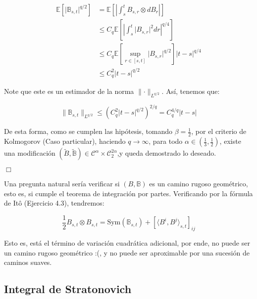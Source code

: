 \begin{itemize}
	\begin{align*}
		\mathbb{E}[ \lvert \mathbb{B}_{s,t} \rvert^{q/2} ] &= \mathbb{E} \left[ \left\lvert \int_s^t B_{s,r} \otimes dB_r \right\rvert \right] \\
		&\leq C_q \mathbb{E} \left[ \left\lvert \int_s^t \lvert B_{s,r} \rvert^2 dr \right\rvert^{q/4} \right] \\
		&\leq C_q \mathbb{E}\left[  \sup_{r \in [s,t]} \lvert B_{s,r} \rvert^{q/2} \right] \lvert t- s \rvert^{q/4} \\
		&\leq C_q^2 \lvert t - s \rvert^{q/2}
	\end{align*}

	Note que este es un estimador de la norma $\lVert \cdot \rVert_{L^{q/2}}$. Así, tenemos que:

	\[
		\lVert \mathbb{B}_{s,t} \rVert_{L^{q/2}} \leq \left( C_q^2 \lvert t- s \rvert^{q/2} \right)^{2/q} = C_q^{4/q} \lvert t- s\rvert
	\]
 

\end{itemize}

De esta forma, como se cumplen las hipótesis, tomando $\beta = \frac{1}{2}$, por el criterio de Kolmogorov (Caso particular), haciendo $q \rightarrow \infty$, para todo $\alpha \in \left( \frac{1}{3}, \frac{1}{2} \right)$, existe una modificación $(\tilde{B}, \tilde{\mathbb{B}}) \in \mathcal{C}^{\alpha} \times \mathcal{C}^{2\alpha}_2$,y queda  demostrado lo deseado.

\begin{flushright}
	$\Box$
\end{flushright}

Una pregunta natural sería verificar si $(B, \mathbb{B})$ es un camino rugoso geométrico, esto es, si cumple el teorema de integración por partes. Verificando por la fórmula de Itô (Ejercicio 4.3), tendremos:

\[
	\frac{1}{2} B_{s,t} \otimes B_{s,t} = \text{Sym}(\mathbb{B}_{s,t}) + \left[\langle B^i, B^j \rangle_{s,t} \right]_{ij}
\]

Esto es, está el término de variación cuadrática adicional, por ende, no puede ser un camino rugoso geométrico :(, y no puede ser aproximable por una sucesión de caminos suaves.


\subsection{Integral de Stratonovich}

